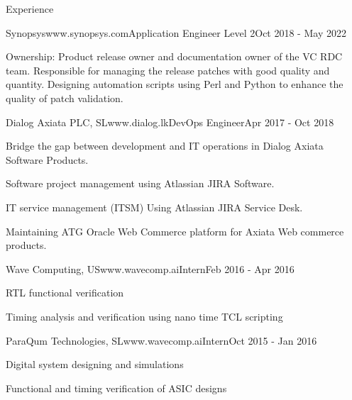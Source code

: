 \documentclass[
11pt, %
]{./assets/resume} %
\begin{document}
\begin{rSection}{Experience}
\begin{rSubsectionX}{Synopsys}{www.synopsys.com}{Application Engineer Level 2}{Oct 2018 - May 2022}
		\item Ownership: Product release owner and documentation owner of the VC RDC team. Responsible for managing the release patches with good quality and quantity. Designing automation scripts using Perl and Python to enhance the quality of patch validation.
	\end{rSubsectionX}
	\begin{rSubsectionX}{Dialog Axiata PLC, SL}{www.dialog.lk}{DevOps Engineer}{Apr 2017 - Oct 2018}
		\item Bridge the gap between development and IT operations in Dialog Axiata Software Products.
		\item Software project management using Atlassian JIRA Software.
		\item IT service management (ITSM) Using Atlassian JIRA Service Desk.
		\item Maintaining ATG Oracle Web Commerce platform for Axiata Web commerce products.
	\end{rSubsectionX}
	\begin{rSubsectionX}{Wave Computing, US}{www.wavecomp.ai}{Intern}{Feb 2016 - Apr 2016}
		\item RTL functional verification
		\item Timing analysis and verification using nano time TCL scripting
	\end{rSubsectionX}
	\begin{rSubsectionX}{ParaQum Technologies, SL}{www.wavecomp.ai}{Intern}{Oct 2015 - Jan 2016}
		\item Digital system designing and simulations
		\item Functional and timing verification of ASIC designs
	\end{rSubsectionX}

\end{rSection}

\end{document}
